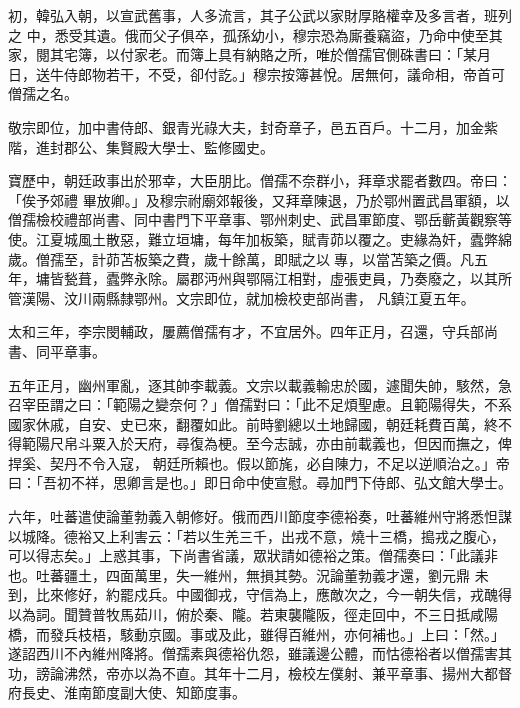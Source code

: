 \begin{pinyinscope}
 初，韓弘入朝，以宣武舊事，人多流言，其子公武以家財厚賂權幸及多言者，班列之
 中，悉受其遺。俄而父子俱卒，孤孫幼小，穆宗恐為廝養竊盜，乃命中使至其家，閱其宅簿，以付家老。而簿上具有納賂之所，唯於僧孺官側硃書曰：「某月日，送牛侍郎物若干，不受，卻付訖。」穆宗按簿甚悅。居無何，議命相，帝首可僧孺之名。



 敬宗即位，加中書侍郎、銀青光祿大夫，封奇章子，邑五百戶。十二月，加金紫階，進封郡公、集賢殿大學士、監修國史。



 寶歷中，朝廷政事出於邪幸，大臣朋比。僧孺不奈群小，拜章求罷者數四。帝曰：「俟予郊禮
 畢放卿。」及穆宗祔廟郊報後，又拜章陳退，乃於鄂州置武昌軍額，以僧孺檢校禮部尚書、同中書門下平章事、鄂州刺史、武昌軍節度、鄂岳蘄黃觀察等使。江夏城風土散惡，難立垣墉，每年加板築，賦青茆以覆之。吏緣為奸，蠹弊綿歲。僧孺至，計茆苫板築之費，歲十餘萬，即賦之以專，以當苫築之價。凡五年，墉皆甃葺，蠹弊永除。屬郡沔州與鄂隔江相對，虛張吏員，乃奏廢之，以其所管漢陽、汶川兩縣隸鄂州。文宗即位，就加檢校吏部尚書，
 凡鎮江夏五年。



 太和三年，李宗閔輔政，屢薦僧孺有才，不宜居外。四年正月，召還，守兵部尚書、同平章事。



 五年正月，幽州軍亂，逐其帥李載義。文宗以載義輸忠於國，遽聞失帥，駭然，急召宰臣謂之曰：「範陽之變奈何？」僧孺對曰：「此不足煩聖慮。且範陽得失，不系國家休戚，自安、史已來，翻覆如此。前時劉總以土地歸國，朝廷耗費百萬，終不得範陽尺帛斗粟入於天府，尋復為梗。至今志誠，亦由前載義也，但因而撫之，俾捍奚、契丹不令入寇，
 朝廷所賴也。假以節旄，必自陳力，不足以逆順治之。」帝曰：「吾初不祥，思卿言是也。」即日命中使宣慰。尋加門下侍郎、弘文館大學士。



 六年，吐蕃遣使論董勃義入朝修好。俄而西川節度李德裕奏，吐蕃維州守將悉怛謀以城降。德裕又上利害云：「若以生羌三千，出戎不意，燒十三橋，搗戎之腹心，可以得志矣。」上惑其事，下尚書省議，眾狀請如德裕之策。僧孺奏曰：「此議非也。吐蕃疆土，四面萬里，失一維州，無損其勢。況論董勃義才還，劉元鼎
 未到，比來修好，約罷戍兵。中國御戎，守信為上，應敵次之，今一朝失信，戎醜得以為詞。聞贊普牧馬茹川，俯於秦、隴。若東襲隴阪，徑走回中，不三日抵咸陽橋，而發兵枝梧，駭動京國。事或及此，雖得百維州，亦何補也。」上曰：「然。」遂詔西川不內維州降將。僧孺素與德裕仇怨，雖議邊公體，而怙德裕者以僧孺害其功，謗論沸然，帝亦以為不直。其年十二月，檢校左僕射、兼平章事、揚州大都督府長史、淮南節度副大使、知節度事。




\end{pinyinscope}
